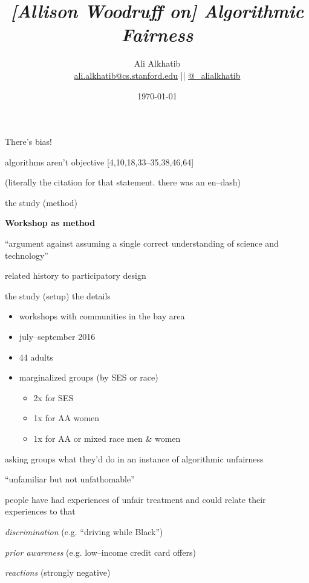 \documentclass[aspectratio=169,12pt]{beamer} %
\title{\textit{[Allison Woodruff on] Algorithmic Fairness}}
\author{{Ali Alkhatib}\\
\href{mailto:ali.alkhatib@cs.stanford.edu}{ali.alkhatib@cs.stanford.edu} ||
         \href{http://twitter.com/_alialkhatib}{@\_alialkhatib}}
\institute[Stanford]{reading with friends}
\date{\today}
\newcommand{\onlyinsubfile}[1]{#1}
\newcommand{\notinsubfile}[1]{}
\begin{document}
\renewcommand{\onlyinsubfile}[1]{}
\renewcommand{\notinsubfile}[1]{#1}

\begin{frame}
\titlepage
\end{frame}

% 
\begin{frame}{There's bias!}

algorithms aren't objective [4,10,18,33--35,38,46,64]

{\footnotesize (literally the citation for that statement. there was an en--dash)}
\end{frame}

\begin{frame}{the study (method)}

\textbf{Workshop as method}

``argument against assuming a single correct understanding of science and technology''

related history to participatory design


\end{frame}



\begin{frame}{the study (setup)}
the details
\begin{itemize}
  \item workshops with communities in the bay area
  \item july--september 2016
  \item 44 adults
  \item marginalized groups (by SES or race)
  \begin{itemize}
    \item 2x for SES
    \item 1x for AA women
    \item 1x for AA or mixed race men \& women
  \end{itemize}
\end{itemize}

asking groups what they'd do in an instance of \alert{algorithmic unfairness}
\end{frame}

\begin{frame}{``unfamiliar but not unfathomable''}
  
  people have had experiences of unfair treatment and could relate their experiences to that

\textit{discrimination} {\footnotesize (e.g. ``driving while Black'')}

\textit{prior awareness} {\footnotesize (e.g. low--income credit card offers)}

\textit{reactions} {\footnotesize (strongly negative)}



\end{frame}
\end{document}
